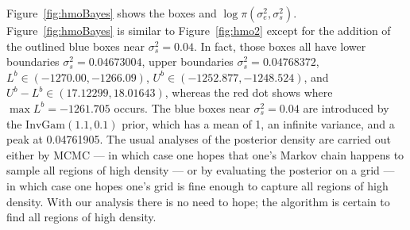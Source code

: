 \documentclass{report}
\newcommand{\IG}{\text{InvGam}}
\newcommand{\sigssq}{\sigma_s^2}
\newcommand{\sigesq}{\sigma_e^2}
\begin{document}
Figure~\ref{fig:hmoBayes} shows the boxes and $\log \pi(\sigesq,\sigssq)$.  Figure~\ref{fig:hmoBayes} is similar to Figure~\ref{fig:hmo2} except for the addition of the outlined blue boxes near $\sigssq = 0.04$.  In fact, those boxes all have lower boundaries $\sigssq = 0.04673004$, upper boundaries $\sigssq = 0.04768372$, $L^b \in (-1270.00, -1266.09)$, $U^b \in (-1252.877, -1248.524)$, and $U^b-L^b \in (17.12299, 18.01643)$, whereas the red dot shows where $\max L^b = -1261.705$ occurs.  The blue boxes near $\sigssq = 0.04$ are introduced by the $\IG(1.1,0.1)$ prior, which has a mean of 1, an infinite variance, and a peak at 0.04761905.  The usual analyses of the posterior density are carried out either by MCMC --- in which case one hopes that one's Markov chain happens to sample all regions of high density --- or by evaluating the posterior on a grid --- in which case one hopes one's grid is fine enough to capture all regions of high density.  With our analysis there is no need to hope; the algorithm is certain to find all regions of high density.
\end{document}
